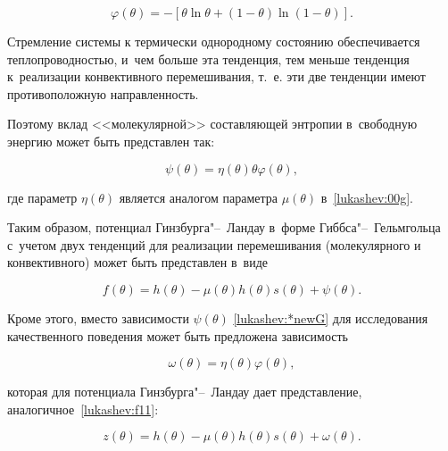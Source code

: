 \begin{equation}

\varphi(\theta)=-[\theta \ln\theta+(1-\theta) \ln(1-\theta)].

\label{lukashev:newS}

\end{equation}



Стремление системы к термически однородному состоянию обеспечивается теплопроводностью, и~чем больше эта тенденция, тем меньше тенденция к~реализации конвективного перемешивания, т.~е. эти две тенденции имеют противоположную направленность. 

Поэтому вклад <<молекулярной>> составляющей энтропии в~свободную энергию может быть представлен так:

\begin{equation}

\psi(\theta)=\eta(\theta)\theta\varphi(\theta),\label{lukashev:*newG}

\end{equation}

где параметр $\eta(\theta)$ является аналогом параметра  $\mu(\theta)$ в~\eqref{lukashev:00g}.



Таким образом, потенциал Гинзбурга"--~Ландау  в~форме Гиббса"--~Гельмгольца с~учетом двух тенденций для реализации перемешивания (молекулярного и конвективного) может быть представлен в~виде

\begin{equation}

f(\theta)=h(\theta)-\mu(\theta) h(\theta) s(\theta)+\psi(\theta).\label{lukashev:f11}

\end{equation}

Кроме этого, вместо зависимости  $\psi(\theta)$ \eqref{lukashev:*newG} для исследования качественного поведения может быть предложена зависимость

\begin{equation}

\omega(\theta)=\eta(\theta)  \varphi(\theta),

\label{lukashev:chi}

\end{equation}

которая для потенциала Гинзбурга"--~Ландау дает представление, аналогичное~\eqref{lukashev:f11}:

\begin{equation}

z(\theta)=h(\theta)-\mu(\theta) h(\theta) s(\theta)+\omega(\theta).

\label{lukashev:z1}

\end{equation}



